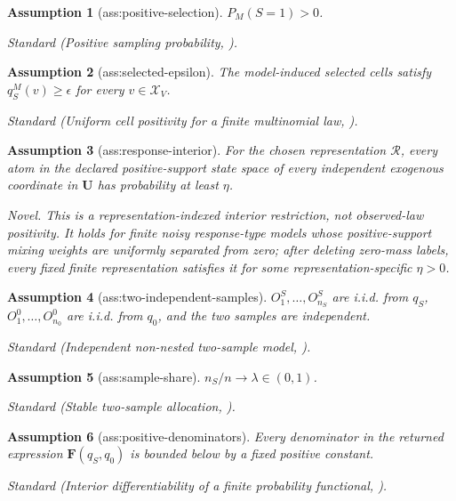 \documentclass{article}
\newtheorem{assumption}{Assumption}
\begin{document}
\begin{assumption}[ass:positive-selection]\label{ass:positive-selection}
\(P_M(S=1)>0\).
\par\smallskip\noindent\emph{Standard} (Positive sampling probability, \cite{CorreaTianBareinboim2019Selection}).
\end{assumption}

\begin{assumption}[ass:selected-epsilon]\label{ass:selected-epsilon}
The model-induced selected cells satisfy \(q_S^M(v)\ge\epsilon\) for every \(v\in\mathcal X_V\).
\par\smallskip\noindent\emph{Standard} (Uniform cell positivity for a finite multinomial law, \cite{vanDerVaart1998}).
\end{assumption}

\begin{assumption}[ass:response-interior]\label{ass:response-interior}
For the chosen representation \(\mathcal R\), every atom in the declared positive-support state space of every independent exogenous coordinate in \(\mathbf U\) has probability at least \(\eta\).
\par\smallskip\noindent\emph{Novel.} This is a representation-indexed interior restriction, not observed-law positivity. It holds for finite noisy response-type models whose positive-support mixing weights are uniformly separated from zero; after deleting zero-mass labels, every fixed finite representation satisfies it for some representation-specific \(\eta>0\).
\end{assumption}

\begin{assumption}[ass:two-independent-samples]\label{ass:two-independent-samples}
\(O_1^S,\ldots,O_{n_S}^S\) are i.i.d. from \(q_S\), \(O_1^0,\ldots,O_{n_0}^0\) are i.i.d. from \(q_0\), and the two samples are independent.
\par\smallskip\noindent\emph{Standard} (Independent non-nested two-sample model, \cite{LiBuchananCole2022ACTG}).
\end{assumption}

\begin{assumption}[ass:sample-share]\label{ass:sample-share}
\(n_S/n\to\lambda\in(0,1)\).
\par\smallskip\noindent\emph{Standard} (Stable two-sample allocation, \cite{LiBuchananCole2022ACTG}).
\end{assumption}

\begin{assumption}[ass:positive-denominators]\label{ass:positive-denominators}
Every denominator in the returned expression \(\mathbf F(q_S,q_0)\) is bounded below by a fixed positive constant.
\par\smallskip\noindent\emph{Standard} (Interior differentiability of a finite probability functional, \cite{vanDerVaart1998}).
\end{assumption}
\end{document}
